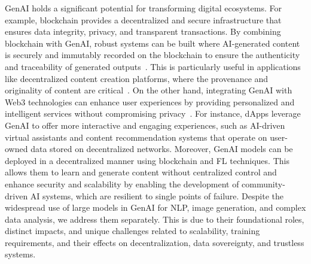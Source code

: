 \documentclass[5p,twocolumn]{elsarticle}
\begin{document}
GenAI holds a significant potential for transforming digital ecosystems. For example, blockchain provides a decentralized and secure infrastructure that ensures data integrity, privacy, and transparent transactions. By combining blockchain with GenAI, robust systems can be built where AI-generated content is securely and immutably recorded on the blockchain to ensure the authenticity and traceability of generated outputs~\cite{nguyen2024generative}. This is particularly useful in applications like decentralized content creation platforms, where the provenance and originality of content are critical~\cite{liu2024blockchainempowered}. On the other hand, integrating GenAI with Web3 technologies can enhance user experiences by providing personalized and intelligent services without compromising privacy~\cite{duan2023metacube}. For instance, dApps leverage GenAI to offer more interactive and engaging experiences, such as AI-driven virtual assistants and content recommendation systems that operate on user-owned data stored on decentralized networks. Moreover, GenAI models can be deployed in a decentralized manner using blockchain and FL techniques. This allows them to learn and generate content without centralized control and enhance security and scalability by enabling the development of community-driven AI systems, which are resilient to single points of failure. Despite the widespread use of large models in GenAI for NLP, image generation, and complex data analysis, we address them separately. This is due to their foundational roles, distinct impacts, and unique challenges related to scalability, training requirements, and their effects on decentralization, data sovereignty, and trustless systems.
\end{document}
